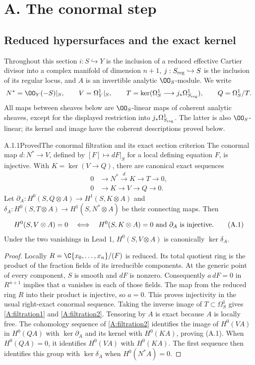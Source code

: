 \section{A. The conormal step}
\subsection{Reduced hypersurfaces and the exact kernel}

Throughout this section $i:S\hookrightarrow Y$ is the inclusion of a reduced effective Cartier divisor into a complex manifold of dimension $n+1$, $j:S_{\rm reg}\hookrightarrow S$ is the inclusion of its regular locus, and $A$ is an invertible analytic $\OO_S$-module. We write
\[
 N^*=\OO_Y(-S)|_S,\qquad V=\Omega_Y^1|_S,\qquad
 T=\ker(\Omega_S^1\longrightarrow j_*\Omega^1_{S_{\rm reg}}),\qquad Q=\Omega_S^1/T.
\]
All maps between sheaves below are $\OO_S$-linear maps of coherent analytic sheaves, except for the displayed restriction into $j_*\Omega^1_{S_{\rm reg}}$. The latter is also $\OO_S$-linear; its kernel and image have the coherent descriptions proved below.

\begin{statement}{A.1.1}{Proved}{The conormal filtration and its exact section criterion}
The conormal map $d:N^*\to V$, defined by $[F]\mapsto dF|_S$ for a local defining equation $F$, is injective. With $K=\ker(V\to Q)$, there are canonical exact sequences
\begin{align}
0&\longrightarrow N^*\xrightarrow{d}K\longrightarrow T\longrightarrow0,
\label{A:filtration1}\\
0&\longrightarrow K\longrightarrow V\longrightarrow Q\longrightarrow0.
\label{A:filtration2}
\end{align}
Let $\partial_A:H^0(S,Q\otimes A)\to H^1(S,K\otimes A)$ and $\delta_A:H^0(S,T\otimes A)\to H^1(S,N^*\otimes A)$ be their connecting maps. Then
\[
 H^0(S,V\otimes A)=0
 \quad\Longleftrightarrow\quad
 H^0(S,K\otimes A)=0\ \hbox{and}\ \partial_A\hbox{ is injective}.
\tag{A.1}
\]
Under the two vanishings in Lead 1, $H^0(S,V\otimes A)$ is canonically $\ker\delta_A$.
\end{statement}
\begin{proof}
Locally $R=\C\{x_0,\ldots,x_n\}/(F)$ is reduced. Its total quotient ring is the product of the fraction fields of its irreducible components. At the generic point of every component, $S$ is smooth and $dF$ is nonzero. Consequently $a\,dF=0$ in $R^{n+1}$ implies that $a$ vanishes in each of those fields. The map from the reduced ring $R$ into their product is injective, so $a=0$. This proves injectivity in the usual right-exact conormal sequence. Taking the inverse image of $T\subset\Omega_S^1$ gives \eqref{A:filtration1} and \eqref{A:filtration2}. Tensoring by $A$ is exact because $A$ is locally free. The cohomology sequence of \eqref{A:filtration2} identifies the image of $H^0(VA)$ in $H^0(QA)$ with $\ker\partial_A$ and its kernel with $H^0(KA)$, proving (A.1). When $H^0(QA)=0$, it identifies $H^0(VA)$ with $H^0(KA)$. The first sequence then identifies this group with $\ker\delta_A$ when $H^0(N^*A)=0$.
\end{proof}

